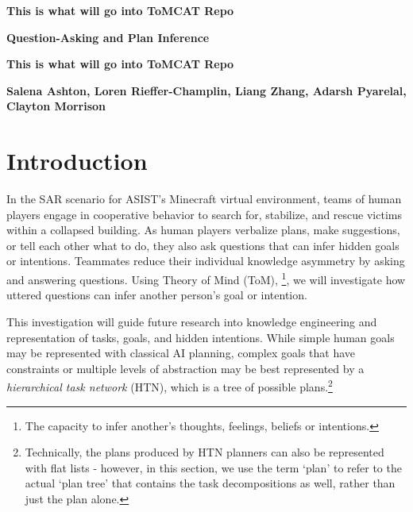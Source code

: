 \documentclass[10pt]{article}
\begin{document}




\textbf{This is what will go into ToMCAT Repo}

\vspace{100pt}
\textbf{Question-Asking and Plan Inference}

\textbf{This is what will go into ToMCAT Repo}


\textbf{Salena Ashton, Loren Rieffer-Champlin, Liang Zhang,
Adarsh Pyarelal, Clayton Morrison}

\section{Introduction}

In the SAR scenario for ASIST's Minecraft virtual environment, teams of human players engage in cooperative behavior to search for, stabilize, and rescue victims within a collapsed building. As human players verbalize plans, make suggestions, or tell each other what to do, they also ask questions that can infer hidden goals or intentions. Teammates reduce their individual knowledge asymmetry by asking and answering questions. Using Theory of Mind (ToM), \footnote{The capacity to infer another's thoughts, feelings, beliefs or intentions.}, we will investigate how uttered questions can infer another person's goal or intention. 

This investigation will guide future research into knowledge engineering and representation of tasks, goals, and hidden intentions. While simple human goals may be represented with classical AI planning, complex goals that have constraints or multiple levels of abstraction may be best represented by a \emph{hierarchical task network} (HTN), which is a tree of possible plans.\footnote{Technically, the plans
    produced by HTN planners can also be represented with flat lists - however,
in this section, we use the term `plan' to refer to the actual `plan tree' that
contains the task decompositions as well, rather than just the plan alone.}
\end{document}
